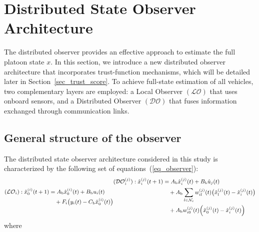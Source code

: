 \documentclass{ifacconf}
\def\eqref#1{(\ref{#1})}
\def\LO{\mathcal{LO}} %
\def\DO{\mathcal{DO}} %
\begin{document}
\section{Distributed State Observer Architecture}\label{sec_Distributed Observer}
The distributed observer provides an effective approach to estimate the full platoon state $x$. In this section, we introduce a new distributed observer architecture that incorporates trust-function mechanisms, which will be detailed later in Section~\ref{sec_trust_score}. To achieve full-state estimation of all vehicles, two complementary layers are employed: a Local Observer $(\LO)$ that uses onboard sensors, and a Distributed Observer $(\DO)$ that fuses information exchanged through communication links.

\subsection{General structure of the observer}
\vspace*{-0.2cm}
The distributed state observer architecture considered in this study is characterized by the following set of equations~\eqref{eq_observer}:
\begin{subequations}\label{eq_observer}
\begin{small}
\begin{align}\label{eq_LO}
(\LO_i): \hat{x}_{0}^{(i)}(t+1)
&= A_{\text{b}} \hat{x}_{0}^{(i)}(t) + B_{\text{b}} u_i(t)\notag \\
&\quad + F_i\big(y_i(t) - C_{\text{b}} \hat{x}_{0}^{(i)}(t)\big) %
\end{align}
\begin{align}\label{eq_DO}
(\DO_i^{(j)}): \hat{x}^{(j)}_i(t+1)
&= A_{\text{b}} \hat{x}_i^{(j)}(t) + B_{\text{b}} \hat{u}_j(t) \notag\\
&\quad+ A_{\text{b}}\sum_{l \in \mathcal{N}_i} w_{i l}^{(j)}(t)
   \big(\hat{x}_l^{(j)}(t)-\hat{x}_i^{(j)}(t)\big)  \notag\\
&\quad + A_{\text{b}} w_{i 0}^{(j)}(t)
   \Big(\hat{x}_0^{(j)}(t)-\hat{x}_i^{(j)}(t)\Big) %
\end{align}
\end{small}
\end{subequations}
where 
\end{document}
